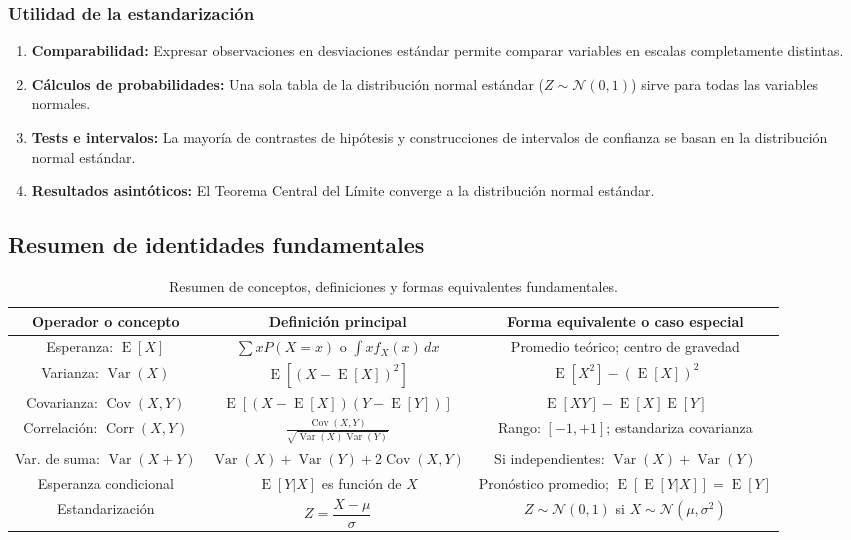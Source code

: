 \documentclass[11pt,a4paper]{article}
\DeclareMathOperator{\E}{E}
\DeclareMathOperator{\Var}{Var}
\DeclareMathOperator{\Cov}{Cov}
\DeclareMathOperator{\Corr}{Corr}
\begin{document}
\subsubsection*{Utilidad de la estandarización}

\begin{enumerate}
\item \textbf{Comparabilidad:} Expresar observaciones en desviaciones estándar permite comparar variables en escalas completamente distintas.
\item \textbf{Cálculos de probabilidades:} Una sola tabla de la distribución normal estándar (\(Z\sim\mathcal{N}(0,1)\)) sirve para todas las variables normales.
\item \textbf{Tests e intervalos:} La mayoría de contrastes de hipótesis y construcciones de intervalos de confianza se basan en la distribución normal estándar.
\item \textbf{Resultados asintóticos:} El Teorema Central del Límite converge a la distribución normal estándar.
\end{enumerate}

\subsection{Resumen de identidades fundamentales}

\begin{table}[H]
\centering
\renewcommand{\arraystretch}{2}
\begin{tabular}{@{}|c|c|c|@{}}
\hline
\textbf{Operador o concepto} & \textbf{Definición principal} & \textbf{Forma equivalente o caso especial} \\
\hline\hline
Esperanza: \(\E[X]\) & \(\displaystyle\sum xP(X=x)\) o \(\int xf_X(x)\,dx\) & Promedio teórico; centro de gravedad \\
\hline
Varianza: \(\Var(X)\) & \(\E[(X-\E[X])^2]\) & \(\E[X^2]-(\E[X])^2\) \\
\hline
Covarianza: \(\Cov(X,Y)\) & \(\E[(X-\E[X])(Y-\E[Y])]\) & \(\E[XY]-\E[X]\E[Y]\) \\
\hline
Correlación: \(\Corr(X,Y)\) & \(\displaystyle\frac{\Cov(X,Y)}{\sqrt{\Var(X)\Var(Y)}}\) & Rango: \([-1,+1]\); estandariza covarianza \\
\hline
Var. de suma: \(\Var(X+Y)\) & \(\Var(X)+\Var(Y)+2\Cov(X,Y)\) & Si independientes: \(\Var(X)+\Var(Y)\) \\
\hline
Esperanza condicional & \(\E[Y|X]\) es función de \(X\) & Pronóstico promedio; \(\E[\E[Y|X]]=\E[Y]\) \\
\hline
Estandarización & \(Z=\dfrac{X-\mu}{\sigma}\) & \(Z\sim\mathcal{N}(0,1)\) si \(X\sim\mathcal{N}(\mu,\sigma^2)\) \\
\hline
\end{tabular}
\caption{Resumen de conceptos, definiciones y formas equivalentes fundamentales.}
\end{table}
\end{document}
